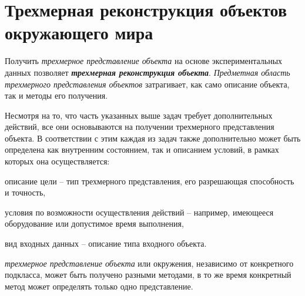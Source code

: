\section{Трехмерная реконструкция объектов окружающего мира}
\label{sec_3d_models_reconstruction}

Получить \textit{трехмерное представление объекта} на основе экспериментальных данных позволяет \textbf{\textit{трехмерная реконструкция объекта}}. \textit{Предметная область трехмерного представления объектов} затрагивает, как само описание объекта, так и методы его получения.

\begin{SCn}
\end{SCn}

Несмотря на то, что часть указанных выше задач требует дополнительных действий, все они основываются на получении трехмерного представления объекта. В соответствии с этим каждая из задач также дополнительно может быть определена как внутренним состоянием, так и описанием условий, в рамках которых она осуществляется:
\begin{textitemize}
    \item описание цели -- тип трехмерного представления, его разрешающая способность и точность,
    \item условия по возможности осуществления действий -- например, имеющееся оборудование или допустимое время выполнения,
    \item вид входных данных -- описание типа входного объекта.
\end{textitemize}

\textit{трехмерное представление объекта} или окружения, независимо от конкретного подкласса, может быть получено разными методами, в то же время конкретный метод может определять только одно представление.

